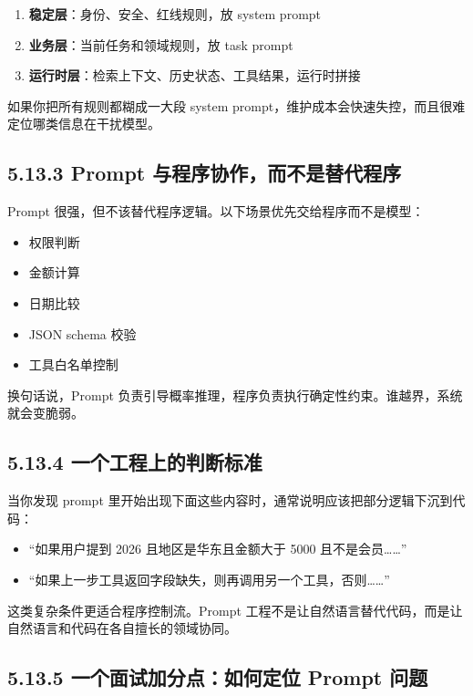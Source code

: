 \begin{enumerate}[leftmargin=2em]
\item \textbf{稳定层}：身份、安全、红线规则，放 system prompt
\item \textbf{业务层}：当前任务和领域规则，放 task prompt
\item \textbf{运行时层}：检索上下文、历史状态、工具结果，运行时拼接
\end{enumerate}

如果你把所有规则都糊成一大段 system prompt，维护成本会快速失控，而且很难定位哪类信息在干扰模型。


\subsection{5.13.3 Prompt 与程序协作，而不是替代程序}

Prompt 很强，但不该替代程序逻辑。以下场景优先交给程序而不是模型：


\begin{itemize}[leftmargin=2em]
\item 权限判断
\item 金额计算
\item 日期比较
\item JSON schema 校验
\item 工具白名单控制
\end{itemize}

换句话说，Prompt 负责引导概率推理，程序负责执行确定性约束。谁越界，系统就会变脆弱。


\subsection{5.13.4 一个工程上的判断标准}

当你发现 prompt 里开始出现下面这些内容时，通常说明应该把部分逻辑下沉到代码：


\begin{itemize}[leftmargin=2em]
\item ``如果用户提到 2026 且地区是华东且金额大于 5000 且不是会员……''
\item ``如果上一步工具返回字段缺失，则再调用另一个工具，否则……''
\end{itemize}

这类复杂条件更适合程序控制流。Prompt 工程不是让自然语言替代代码，而是让自然语言和代码在各自擅长的领域协同。


\subsection{5.13.5 一个面试加分点：如何定位 Prompt 问题}

